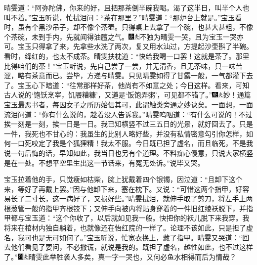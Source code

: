 晴雯道：``阿弥陀佛，你来的好，且把那茶倒半碗我喝。渴了这半日，叫半个人也叫不着。''宝玉听说，忙拭泪问：``茶在那里？''晴雯道：``那炉台上就是。''宝玉看时，虽有个黑沙吊子，却不像个茶壶。只得桌上去拿了一个碗，也甚大甚粗，不像个茶碗，未到手内，先就闻得油膻之气。{\includegraphics[width=3mm]{../Images/00004}\includegraphics[width=3mm]{../Images/00012}\footnotesize \kaishu 不独为晴雯一哭，且为宝玉一哭亦可。}宝玉只得拿了来，先拿些水洗了两次，复又用水汕过，方提起沙壶斟了半碗。看时，绛红的，也太不成茶。晴雯扶枕道：``快给我喝一口罢！这就是茶了。那里比得咱们的茶！''宝玉听说，先自己尝了一尝，并无清香，且无茶味，只一味苦涩，略有茶意而已。尝毕，方递与晴雯。只见晴雯如得了甘露一般，一气都灌下去了。宝玉心下暗道：``往常那样好茶，他尚有不如意之处；今日这样。看来，可知古人说的`饱饫烹宰，饥餍糟糠'，又道是`饭饱弄粥'，可见都不错了。''{\includegraphics[width=3mm]{../Images/00004}\includegraphics[width=3mm]{../Images/00012}\footnotesize \kaishu 妙！通篇宝玉最恶书者，每因女子之所历始信其可，此谓触类旁通之妙诀矣。}一面想，一面流泪问道：``你有什么说的，趁着没人告诉我。''晴雯呜咽道：``有什么可说的！不过挨一刻是一刻，挨一日是一日。我已知横竖不过三五日的光景，就好回去了。只是一件，我死也不甘心的：我虽生的比别人略好些，并没有私情密意勾引你怎样，如何一口死咬定了我是个狐狸精！我太不服。今日既已担了虚名，而且临死，不是我说一句后悔的话，早知如此，我当日也另有个道理。不料痴心傻意，只说大家横竖是在一处。不想平空里生出这一节话来，有冤无处诉。''说毕又哭。

宝玉拉着他的手，只觉瘦如枯柴，腕上犹戴着四个银镯，因泣道：``且卸下这个来，等好了再戴上罢。''因与他卸下来，塞在枕下。又说：``可惜这两个指甲，好容易长了二寸长，这一病好了，又损好些。''晴雯拭泪，就伸手取了剪刀，将左手上两根葱管一般的指甲齐根铰下；又伸手向被内将贴身穿着的一件旧红绫袄脱下，并指甲都与宝玉道：``这个你收了，以后就如见我一般。快把你的袄儿脱下来我穿。我将来在棺材内独自躺着，也就像还在怡红院的一样了。论理不该如此，只是担了虚名，我可也是无可如何了。''宝玉听说，忙宽衣换上，藏了指甲。晴雯又哭道：``回去他们看见了要问，不必撒谎，就说是我的。既担了虚名，越性如此，也不过这样了。''{\includegraphics[width=3mm]{../Images/00007}\includegraphics[width=3mm]{../Images/00012}\footnotesize \kaishu 晴雯此举胜袭人多矣，真一字一哭也，又何必鱼水相得而后为情哉？}

